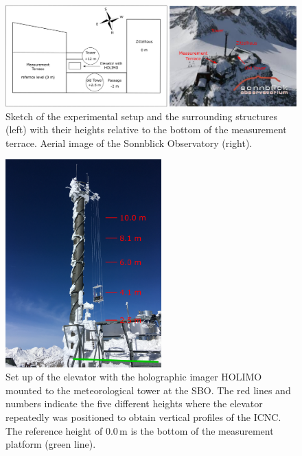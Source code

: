 \documentclass[draft,linenumbers]{agujournal}
\begin{document}


\newpage

\begin{figure}[t]
 \centering
 	\includegraphics[width=14cm]{SONSetUp.png}
 \caption{Sketch of the experimental setup and the surrounding structures (left) with their heights relative to the bottom of the measurement terrace. Aerial image of the Sonnblick Observatory (right).}
 \label{fig:SetUp}
\end{figure}

\begin{figure}[t]
 \centering
 	\includegraphics[width=6cm]{tower.png}
 \caption{Set up of the elevator with the holographic imager HOLIMO mounted to the meteorological tower at the SBO. The red lines and numbers indicate the five different heights where the elevator repeatedly was positioned to obtain vertical profiles of the ICNC. The reference height of 0.0\,\si{m} is the bottom of the measurement platform (green line).}
 \label{fig:Elevator}
\end{figure}
\end{document}
